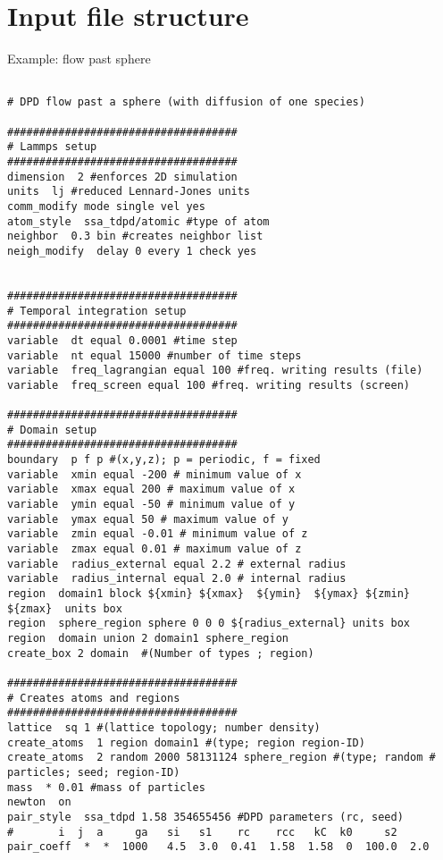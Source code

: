 \documentclass[a4paper,12pt,oneside]{report}
\begin{document}
\pagebreak

\section{Input file structure}

  Example: flow past sphere
  
\begin{lstlisting}

# DPD flow past a sphere (with diffusion of one species)

####################################
# Lammps setup
####################################
dimension  2 #enforces 2D simulation
units  lj #reduced Lennard-Jones units
comm_modify mode single vel yes
atom_style  ssa_tdpd/atomic #type of atom
neighbor  0.3 bin #creates neighbor list
neigh_modify  delay 0 every 1 check yes


####################################
# Temporal integration setup
####################################
variable  dt equal 0.0001 #time step
variable  nt equal 15000 #number of time steps
variable  freq_lagrangian equal 100 #freq. writing results (file)
variable  freq_screen equal 100 #freq. writing results (screen)

####################################
# Domain setup
####################################
boundary  p f p #(x,y,z); p = periodic, f = fixed
variable  xmin equal -200 # minimum value of x
variable  xmax equal 200 # maximum value of x
variable  ymin equal -50 # minimum value of y
variable  ymax equal 50 # maximum value of y
variable  zmin equal -0.01 # minimum value of z
variable  zmax equal 0.01 # maximum value of z
variable  radius_external equal 2.2 # external radius
variable  radius_internal equal 2.0 # internal radius
region  domain1 block ${xmin} ${xmax}  ${ymin}  ${ymax} ${zmin} ${zmax}  units box
region	sphere_region sphere 0 0 0 ${radius_external} units box
region  domain union 2 domain1 sphere_region
create_box 2 domain  #(Number of types ; region) 

####################################
# Creates atoms and regions
####################################
lattice  sq 1 #(lattice topology; number density)
create_atoms  1 region domain1 #(type; region region-ID)
create_atoms  2 random 2000 58131124 sphere_region #(type; random # particles; seed; region-ID)
mass  * 0.01 #mass of particles
newton  on
pair_style  ssa_tdpd 1.58 354655456 #DPD parameters (rc, seed)
#	    i  j  a     ga   si   s1    rc    rcc   kC  k0     s2 
pair_coeff  *  *  1000   4.5  3.0  0.41  1.58  1.58  0  100.0  2.0


\end{lstlisting}
\end{document}
